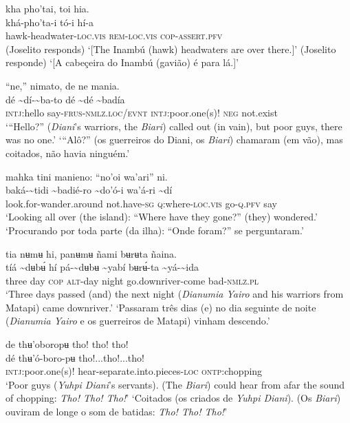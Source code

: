 \documentclass[output=paper,
modfonts,nonflat
]{langsci/langscibook}
\begin{document}
\newpage 
\ea kha pho'tai, toi hia. \\[.3em]
\gll khá-pho'ta-i	tó-i	hí-a \\
     hawk-headwater\textsc{-loc.vis}	\textsc{rem-loc.vis}	\textsc{cop-assert.pfv}\\
\glt  (Joselito responds) ‘[The Inambú (hawk) headwaters are over there.]’
\glt  (Joselito responde) ‘[A cabeçeira do Inambú (gavião) é para lá.]’
\z 

\ea “ne,” nimato, de ne mania.  \\[.3em]
\gll {\textasciitilde}dé	{\textasciitilde}dí-{\textasciitilde}ba-to	dé	{\textasciitilde}dé	{\textasciitilde}badía \\
     \textsc{intj:}hello	say-\textsc{frus-nmlz.loc/evnt}	\textsc{intj:}poor.one(s)!	\textsc{neg}	not.exist\\
\glt ‘“Hello?” (\textit{Diani}'s warriors, the \textit{Biari}) called out (in vain), but poor guys, there was no one.’
\glt ‘“Alô?” (os guerreiros do Diani, os \textit{Biari}) chamaram (em vão), mas coitados, não havia ninguém.’
\z 

 
\ea mahka tini manieno: “no'oi wa'ari” ni. \\[.3em]
\gll {\textasciitilde}baká-{\textasciitilde}tidi	{\textasciitilde}badié-ro	{\textasciitilde}do'ó-i	wa'á-ri	{\textasciitilde}dí \\
     look.for-wander.around	not.have\textsc{-sg}	\textsc{q:}where\textsc{-loc.vis}	go-\textsc{q.pfv}	say\\
\glt ‘Looking all over (the island): “Where have they gone?” (they) wondered.’
\glt ‘Procurando por toda parte (da ilha): “Onde foram?” se perguntaram.’
\z 

\ea tia nʉmʉ hi, panʉmʉ ñami bʉrʉta ñaina. \\[.3em]
\gll tíá	{\textasciitilde}dʉbʉ́	hí	pá-{\textasciitilde}dʉbʉ	{\textasciitilde}yabí	bʉrʉ́-ta	{\textasciitilde}yá-{\textasciitilde}ida \\
     three	day	\textsc{cop}	\textsc{alt}-day	night	go.downriver-come	bad\textsc{-nmlz.pl}\\
\glt ‘Three days passed (and) the next night (\textit{Dianumia Yairo} and his warriors from Matapi) came downriver.’
\glt ‘Passaram três dias (e) no dia seguinte de noite (\textit{Dianumia Yairo} e os guerreiros de Matapi) vinham descendo.’
\z 

\ea de thʉ'oboropʉ tho! tho! tho! \\[.3em]
\gll dé	thʉ'ó-boro-pʉ	tho!...tho!...tho! \\
     \textsc{intj:}poor.one(s)!	hear-separate.into.pieces\textsc{-loc}	\textsc{ontp:}chopping\\
\glt ‘Poor guys (\textit{Yuhpi Diani}'s servants). (The \textit{Biari}) could hear from afar the sound of chopping: \textit{Tho! Tho! Tho!}’
\glt ‘Coitados (os criados de \textit{Yuhpi Diani}). (Os \textit{Biari}) ouviram de longe o som de batidas: \textit{Tho! Tho! Tho!}’ 
\z 
\end{document}

